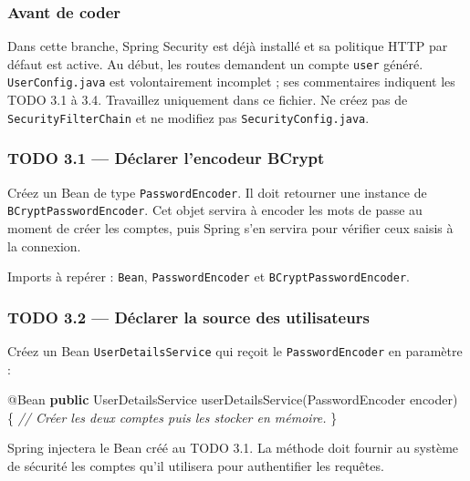 \documentclass[
  french,
  10pt,
  a4paper,
]{article}
\newenvironment{Shaded}{}{}
\newcommand{\AttributeTok}[1]{\textcolor[rgb]{0.49,0.56,0.16}{#1}}
\newcommand{\CommentTok}[1]{\textcolor[rgb]{0.38,0.63,0.69}{\textit{#1}}}
\newcommand{\FunctionTok}[1]{\textcolor[rgb]{0.02,0.16,0.49}{#1}}
\newcommand{\KeywordTok}[1]{\textcolor[rgb]{0.00,0.44,0.13}{\textbf{#1}}}
\newcommand{\NormalTok}[1]{#1}
\newcommand{\OperatorTok}[1]{\textcolor[rgb]{0.40,0.40,0.40}{#1}}
\begin{document}
\subsubsection{Avant de coder}\label{avant-de-coder}

Dans cette branche, Spring Security est déjà installé et sa politique
HTTP par défaut est active. Au début, les routes demandent un compte
\texttt{user} généré. \texttt{UserConfig.java} est volontairement
incomplet ; ses commentaires indiquent les TODO 3.1 à 3.4. Travaillez
uniquement dans ce fichier. Ne créez pas de \texttt{SecurityFilterChain}
et ne modifiez pas \texttt{SecurityConfig.java}.

\subsubsection{TODO 3.1 --- Déclarer l'encodeur
BCrypt}\label{todo-3.1-duxe9clarer-lencodeur-bcrypt}

Créez un Bean de type \texttt{PasswordEncoder}. Il doit retourner une
instance de \texttt{BCryptPasswordEncoder}. Cet objet servira à encoder
les mots de passe au moment de créer les comptes, puis Spring s'en
servira pour vérifier ceux saisis à la connexion.

Imports à repérer : \texttt{Bean}, \texttt{PasswordEncoder} et
\texttt{BCryptPasswordEncoder}.

\subsubsection{TODO 3.2 --- Déclarer la source des
utilisateurs}\label{todo-3.2-duxe9clarer-la-source-des-utilisateurs}

Créez un Bean \texttt{UserDetailsService} qui reçoit le
\texttt{PasswordEncoder} en paramètre :

\begin{Shaded}
\begin{Highlighting}[]
\AttributeTok{@Bean}
\KeywordTok{public}\NormalTok{ UserDetailsService }\FunctionTok{userDetailsService}\OperatorTok{(}\NormalTok{PasswordEncoder encoder}\OperatorTok{)} \OperatorTok{\{}
    \CommentTok{// Créer les deux comptes puis les stocker en mémoire.}
\OperatorTok{\}}
\end{Highlighting}
\end{Shaded}

Spring injectera le Bean créé au TODO 3.1. La méthode doit fournir au
système de sécurité les comptes qu'il utilisera pour authentifier les
requêtes.
\end{document}
